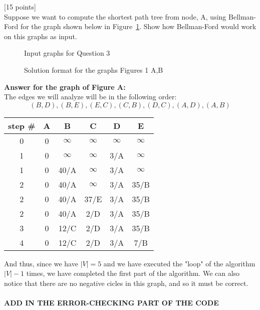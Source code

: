 \documentclass[12pt]{article}
\newcounter{ques}
\newenvironment{question}{\stepcounter{ques}{\noindent\bf Question \arabic{ques}:}}{\vspace{5mm}}
\begin{document}
\begin{question}[15 points]\\
	Suppose we want to compute the shortest path tree from node, A,  using Bellman-Ford for the graph shown below in Figure~\ref{fig:Bellman-Ford}. Show how Bellman-Ford would work on this graphs as input.

\newpage
\begin{figure}
	\centerline{}
	\caption{Input graphs for Question 3}
	\label{fig:Bellman-Ford}
\end{figure}

\begin{figure}
	\centerline{}
	\caption{Solution format for the graphs Figures 1  A,B}
	\label{fig:Bellman-FordTable}
\end{figure}
\textbf{Answer for the graph of Figure A:}\\
The edges we will analyze will be in the following order:
$$(B, D), (B, E), (E, C), (C, B), (D, C), (A, D), (A, B)$$
\begin{center}
  \begin{tabular}{||c | c c c c c||}
   \hline
    step \# & A & B & C & D & E \\ [0.5ex]
   \hline\hline
   0 & 0 & $\infty$ & $\infty$ & $\infty$ & $\infty$\\
   \hline
   1 & 0 & $\infty$ & $\infty$ & 3/A & $\infty$\\
   1 & 0 & 40/A & $\infty$ & 3/A & $\infty$\\
   \hline
   2 & 0 & 40/A & $\infty$ & 3/A & 35/B\\
   2 & 0 & 40/A & 37/E & 3/A & 35/B\\
   2 & 0 & 40/A & 2/D & 3/A & 35/B\\
   \hline
   3 & 0 & 12/C & 2/D & 3/A & 35/B\\
   \hline
   4 & 0 & 12/C & 2/D & 3/A & 7/B\\
   \hline
  \end{tabular}
\end{center}
And thus, since we have $|V|=5$ and we have executed the "loop" of the algorithm $|V|-1$ times, we have completed the first part of the algorithm. We can also notice that there are no negative cicles in this graph, and so it must be correct.\\\\
\textbf{ADD IN THE ERROR-CHECKING PART OF THE CODE}\\\\

\end{question}
\end{document}
